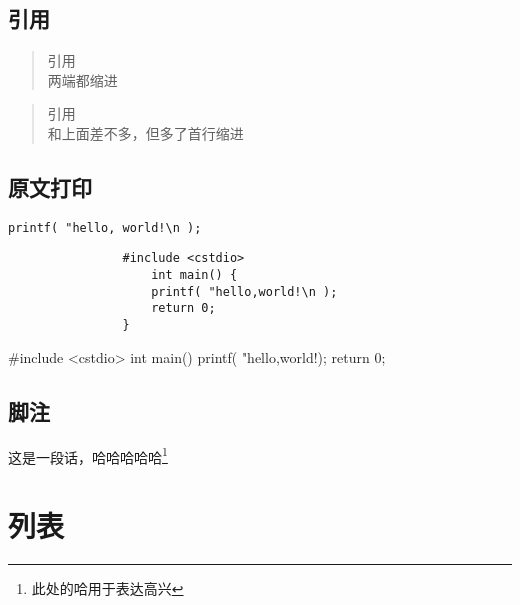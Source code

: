 \documentclass{article}
\begin{document}
			\subsection{引用}
			\begin{quote} 
			    引用 \\两端都缩进
		    \end{quote}
		    \begin{quotation}
		    	引用 \\ 和上面差不多，但多了首行缩进
		    \end{quotation}
		    \subsection{原文打印}
		    \verb|printf( "hello, world!\n );|
		    \begin{verbatim}
				#include <cstdio>
				    int main() {
				    printf( "hello,world!\n );
				    return 0;
				}
		    \end{verbatim}
		    \begin{verbatim*}
   				#include <cstdio>
	   			    int main() {
	   			    printf( "hello,world!\n );
	   			    return 0;
   				}
		    \end{verbatim*}
		    \label{CODE}
			\subsection{脚注}
			这是一段话，哈哈哈哈哈\footnote{此处的哈用于表达高兴}
		\section{列表}
\end{document}
